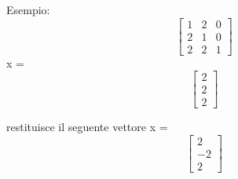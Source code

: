 


Esempio: 
\[\begin{bmatrix}
	1 & 2 & 0 \\ 
	2 & 1 & 0 \\
	2 & 2 & 1 
\end{bmatrix}\]	
x =
\[\begin{bmatrix}
  2 \\
  2 \\
  2
\end{bmatrix}\]

restituisce il seguente vettore
x =
\[\begin{bmatrix}
  2 \\
  -2 \\
  2
\end{bmatrix}\]